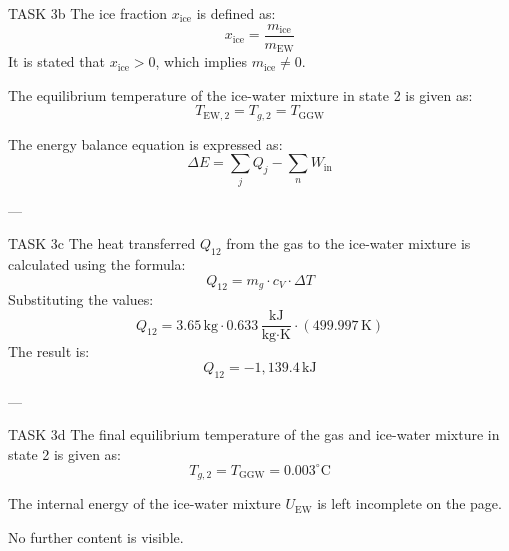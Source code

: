 TASK 3b  
The ice fraction \( x_{\text{ice}} \) is defined as:  
\[
x_{\text{ice}} = \frac{m_{\text{ice}}}{m_{\text{EW}}}
\]  
It is stated that \( x_{\text{ice}} > 0 \), which implies \( m_{\text{ice}} \neq 0 \).  

The equilibrium temperature of the ice-water mixture in state 2 is given as:  
\[
T_{\text{EW},2} = T_{g,2} = T_{\text{GGW}}
\]  

The energy balance equation is expressed as:  
\[
\Delta E = \sum_j Q_j - \sum_n W_{\text{in}}
\]  

---

TASK 3c  
The heat transferred \( Q_{12} \) from the gas to the ice-water mixture is calculated using the formula:  
\[
Q_{12} = m_g \cdot c_V \cdot \Delta T
\]  
Substituting the values:  
\[
Q_{12} = 3.65 \, \text{kg} \cdot 0.633 \, \frac{\text{kJ}}{\text{kg·K}} \cdot (499.997 \, \text{K})
\]  
The result is:  
\[
Q_{12} = -1,139.4 \, \text{kJ}
\]  

---

TASK 3d  
The final equilibrium temperature of the gas and ice-water mixture in state 2 is given as:  
\[
T_{g,2} = T_{\text{GGW}} = 0.003^\circ\text{C}
\]  

The internal energy of the ice-water mixture \( U_{\text{EW}} \) is left incomplete on the page.  

No further content is visible.